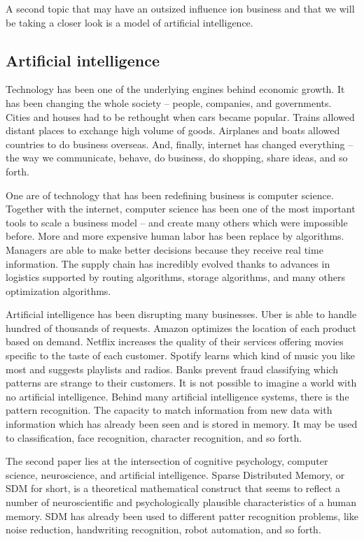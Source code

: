 A second topic that may have an outsized influence ion business and that we will be taking a closer look is a model of artificial intelligence.  

\subsection{Artificial intelligence}

Technology has been one of the underlying engines behind economic growth. It has been changing the whole society -- people, companies, and governments. Cities and houses had to be rethought when cars became popular. Trains allowed distant places to exchange high volume of goods. Airplanes and boats allowed countries to do business overseas. And, finally, internet has changed everything -- the way we communicate, behave, do business, do shopping, share ideas, and so forth.

One are of technology that has been redefining business is computer science. Together with the internet, computer science has been one of the most important tools to scale a business model -- and create many others which were impossible before. More and more expensive human labor has been replace by algorithms. Managers are able to make better decisions because they receive real time information. The supply chain has incredibly evolved thanks to advances in logistics supported by routing algorithms, storage algorithms, and many others optimization algorithms.

Artificial intelligence has been disrupting many businesses. Uber is able to handle hundred of thousands of requests. Amazon optimizes the location of each product based on demand. Netflix increases the quality of their services offering movies specific to the taste of each customer. Spotify learns which kind of music you like most and suggests playlists and radios. Banks prevent fraud classifying which patterns are strange to their customers. It is not possible to imagine a world with no artificial intelligence. Behind many artificial intelligence systems, there is the pattern recognition. The capacity to match information from new data with information which has already been seen and is stored in memory. It may be used to classification, face recognition, character recognition, and so forth.

The second paper lies at the intersection of cognitive psychology, computer science, neuroscience, and artificial intelligence.  Sparse Distributed Memory, or SDM for short, is a theoretical mathematical construct that seems to reflect a number of neuroscientific and psychologically plausible characteristics of a human memory. SDM has already been used to different patter recognition problems, like noise reduction, handwriting recognition, robot automation, and so forth.

